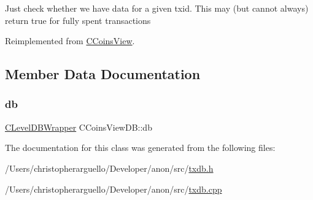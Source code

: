 Just check whether we have data for a given txid. This may (but cannot always) return true for fully spent transactions 

Reimplemented from \mbox{\hyperlink{class_c_coins_view_ade3a65fc3f1b02baf7bebce630e4eba3}{C\+Coins\+View}}.



\subsection{Member Data Documentation}
\mbox{\label{class_c_coins_view_d_b_aba0a7b26fe82c1a2e80ca060d12fb66a}} 
\subsubsection{\texorpdfstring{db}{db}}
{\footnotesize\ttfamily \mbox{\hyperlink{class_c_level_d_b_wrapper}{C\+Level\+D\+B\+Wrapper}} C\+Coins\+View\+D\+B\+::db\hspace{0.3cm}{\ttfamily [protected]}}



The documentation for this class was generated from the following files\+:\begin{DoxyCompactItemize}
\item 
/\+Users/christopherarguello/\+Developer/anon/src/\mbox{\hyperlink{txdb_8h}{txdb.\+h}}\item 
/\+Users/christopherarguello/\+Developer/anon/src/\mbox{\hyperlink{txdb_8cpp}{txdb.\+cpp}}\end{DoxyCompactItemize}
